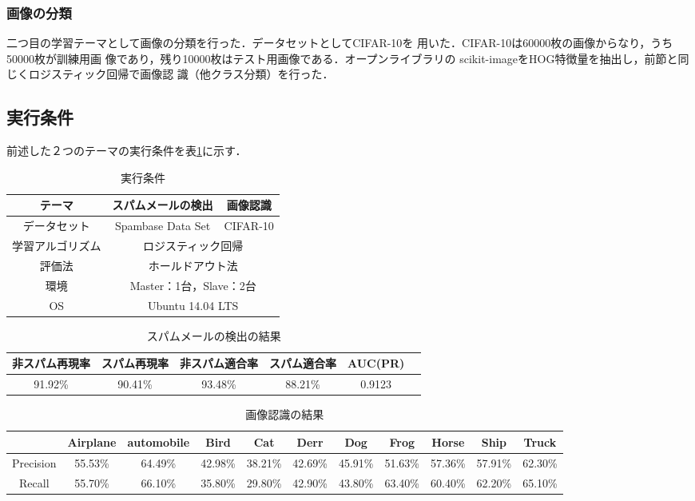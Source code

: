 \documentclass[a4paper,12pt]{jarticle}
\begin{document}
\subsubsection{画像の分類}
二つ目の学習テーマとして画像の分類を行った．データセットとしてCIFAR-10\cite{CIFAR}を
用いた．CIFAR-10は60000枚の画像からなり，うち50000枚が訓練用画
像であり，残り10000枚はテスト用画像である．オープンライブラリの
scikit-imageをHOG特徴量を抽出し，前節と同じくロジスティック回帰で画像認
識（他クラス分類）を行った．

\subsection{実行条件}
前述した２つのテーマの実行条件を表\ref{tab:実行条件}に示す．
\begin{table}[hbtp]
\centering
\caption{実行条件}
\label{tab:実行条件}
\fontsize{9pt}{10pt}\selectfont
 \begin{tabular}{|c||c|c|} \hline
 テーマ &スパムメールの検出& 画像認識\\ \hline \hline
データセット& Spambase Data Set& CIFAR-10\\ \hline
  学習アルゴリズム& \multicolumn{2}{|c|}{ロジスティック回帰}\\ \hline
  評価法&\multicolumn{2}{|c|}{ホールドアウト法}\\ \hline
  環境&\multicolumn{2}{|c|}{Master：1台，Slave：2台}\\ \hline
  OS&\multicolumn{2}{|c|}{Ubuntu 14.04 LTS}\\ \hline
\end{tabular}
\end{table}


\begin{table}[hbt]
\centering
\caption{スパムメールの検出の結果}
\label{tab:実験結果}
\fontsize{9pt}{10pt}\selectfont
\begin{tabular}{|c|c|c|c|c|c|} \hline
非スパム再現率&スパム再現率&非スパム適合率&スパム適合率&AUC(PR) \\ \hline
91.92\% & 90.41\% & 93.48\% & 88.21\% & 0.9123 \\ \hline
\end{tabular}
\end{table}

\begin{table}[hbt]
\centering
\caption{画像認識の結果}
 \label{tab:実験結果2}
\fontsize{9pt}{10pt}\selectfont
 \begin{tabular}{c|c|c|c|c|c|c|c|c|c|c} \hline
  &Airplane&automobile&Bird&Cat&Derr&Dog&Frog&Horse&Ship&Truck \\ \hline
 Precision&55.53\% & 64.49\% & 42.98\% & 38.21\%& 42.69\% & 45.91\% & 51.63\% & 57.36\% & 57.91\% & 62.30\% \\ \hline
 Recall&55.70\% & 66.10\% & 35.80\% & 29.80\% &42.90\% & 43.80\% &63.40\% & 60.40\% & 62.20\% & 65.10\%  \\ \hline
\end{tabular}
\end{table}
\end{document}
